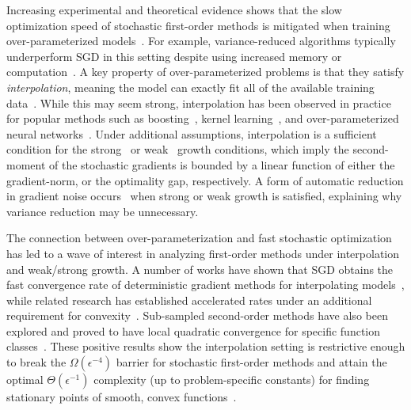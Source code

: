 Increasing experimental and theoretical evidence shows that the slow optimization speed of stochastic first-order methods is mitigated when training over-parameterized models~\citep{ma2018power, arora2018overparameterization, zhou2019analysis}.
For example, variance-reduced algorithms typically underperform \ac{SGD} in this setting despite using increased memory or computation~\citep{defazio2019effectiveness, ma2018power}. 
A key property of over-parameterized problems is that they satisfy \emph{interpolation}, meaning the model can exactly fit all of the available training data~\citep{belkin2019datainterp}.
While this may seem strong, interpolation has been observed in practice for popular methods such as boosting~\citep{schapire1997boosting}, kernel learning~\citep{belkin2019datainterp}, and over-parameterized neural networks~\citep{belkin2019reconciling, zhang2013gradient}. 
Under additional assumptions, interpolation is a sufficient condition for the strong~\citep{solodov1998incremental, tseng1998incremental, schmidt2013fast} or weak~\citep{vaswani2019fast, bassily2018exponential} growth conditions, which imply the second-moment of the stochastic gradients is bounded by a linear function of either the gradient-norm, or the optimality gap, respectively.
A form of automatic reduction in gradient noise occurs~\citep{liu2020accelerating} when strong or weak growth is satisfied, explaining why variance reduction may be unnecessary. 

The connection between over-parameterization and fast stochastic optimization has led to a wave of interest in analyzing first-order methods under interpolation and weak/strong growth.
A number of works have shown that \ac{SGD} obtains the fast convergence rate of deterministic gradient methods for interpolating models~\citep{schmidt2013fast, bassily2018exponential, vaswani2019fast, cevher2018linear, jain2018accelerating}, while related research has established accelerated rates under an additional requirement for convexity~\citep{liu2020accelerating, vaswani2019fast, jain2018accelerating}.
Sub-sampled second-order methods have also been explored and proved to have local quadratic convergence for specific function classes~\citep{meng2020fastandfurious}.
These positive results show the interpolation setting is restrictive enough to break the \( \Omega(\epsilon^{-4}) \) barrier for stochastic first-order methods and attain the optimal \( \Theta(\epsilon^{-1}) \) complexity (up to problem-specific constants) for finding stationary points of smooth, convex functions~\citep{nemirovsky1985optimal, arjevani2016iteration}. 

